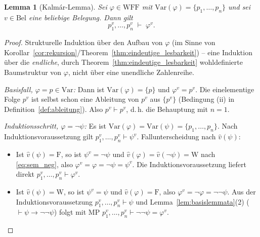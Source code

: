 \documentclass[12pt, a4paper]{article}
\newtheorem{lemma}[theorem]{Lemma}
\theoremstyle{definition}
\theoremstyle{remark}
\newcommand{\W}{\mathrm{W}}
\newcommand{\F}{\mathrm{F}}
\newcommand{\WFF}{\mathrm{WFF}}
\newcommand{\Var}{\mathrm{Var}}
\newcommand{\Bel}{\mathrm{Bel}}
\begin{document}
\begin{lemma}[Kalmár-Lemma]
\label{lem:kalmar}
Sei $\varphi \in \WFF$ mit $\Var(\varphi) = \{p_1,\dots,p_n\}$ und sei $v \in \Bel$ eine beliebige Belegung. Dann gilt
\[
  p_1^v, \dots, p_n^v \;\vdash\; \varphi^v.
\]
\end{lemma}
\begin{proof}
Strukturelle Induktion über den Aufbau von $\varphi$ (im Sinne von Korollar~\ref{cor:rekursion}/Theorem~\ref{thm:eindeutige_lesbarkeit}) -- eine Induktion über die \emph{endliche}, durch Theorem~\ref{thm:eindeutige_lesbarkeit} wohldefinierte Baumstruktur von $\varphi$, nicht über eine unendliche Zahlenreihe.

\emph{Basisfall, $\varphi = p \in \Var$:} Dann ist $\Var(\varphi)=\{p\}$ und $\varphi^v = p^v$. Die einelementige Folge $p^v$ ist selbst schon eine Ableitung von $p^v$ aus $\{p^v\}$ (Bedingung (ii) in Definition~\ref{def:ableitung}). Also $p^v \vdash p^v$, d.\,h. die Behauptung mit $n=1$.

\emph{Induktionsschritt, $\varphi = \neg\psi$:} Es ist $\Var(\varphi)=\Var(\psi)=\{p_1,\dots,p_n\}$. Nach Induktionsvoraussetzung gilt $p_1^v,\dots,p_n^v \vdash \psi^v$. Fallunterscheidung nach $\hat v(\psi)$:
\begin{itemize}
  \item Ist $\hat v(\psi)=\F$, so ist $\psi^v = \neg\psi$ und $\hat v(\varphi)=\hat v(\neg\psi)=\W$ nach \eqref{eq:sem_neg}, also $\varphi^v = \varphi = \neg\psi = \psi^v$. Die Induktionsvoraussetzung liefert direkt $p_1^v,\dots,p_n^v \vdash \varphi^v$.
  \item Ist $\hat v(\psi)=\W$, so ist $\psi^v=\psi$ und $\hat v(\varphi)=\F$, also $\varphi^v=\neg\varphi=\neg\neg\psi$. Aus der Induktionsvoraussetzung $p_1^v,\dots,p_n^v\vdash\psi$ und Lemma~\ref{lem:basislemmata}(2) ($\vdash\psi\to\neg\neg\psi$) folgt mit MP $p_1^v,\dots,p_n^v \vdash \neg\neg\psi = \varphi^v$.
\end{itemize}


\end{proof}
\end{document}

